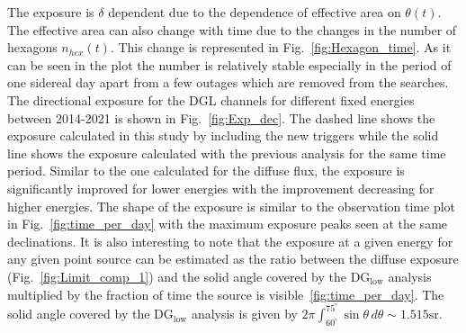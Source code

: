 The exposure is $\delta$ dependent due to the dependence of effective area on $\theta(t)$. The effective area can also change with time due to the changes in the number of hexagons $n_{hex}(t)$. This change is represented in Fig.~\ref{fig:Hexagon_time}. As it can be seen in the plot the number is relatively stable especially in the period of one sidereal day apart from a few outages which are removed from the searches. The directional exposure for the DGL channels for different fixed energies between 2014-2021 is shown in Fig.~\ref{fig:Exp_dec}. The dashed line shows the exposure calculated in this study by including the new triggers while the solid line shows the exposure calculated with the previous analysis for the same time period. Similar to the one calculated for the diffuse flux, the exposure is significantly improved for lower energies with the improvement decreasing for higher energies. The shape of the exposure is similar to the observation time plot in Fig.~\ref{fig:time_per_day} with the maximum exposure peaks seen at the same declinations. It is also interesting to note that the exposure at a given energy for any given point source can be estimated as the ratio between the diffuse exposure (Fig.~\ref{fig:Limit_comp_1}) and the solid angle covered by the DG$_{\text{low}}$ analysis multiplied by the fraction of time the source is visible~\ref{fig:time_per_day}. The solid angle covered by the DG$_{\text{low}}$ analysis is given by $2\pi \int_{60^{\circ}}^{75^{\circ}} \sin \theta \,d \theta \sim 1.515 \text{sr}$.


